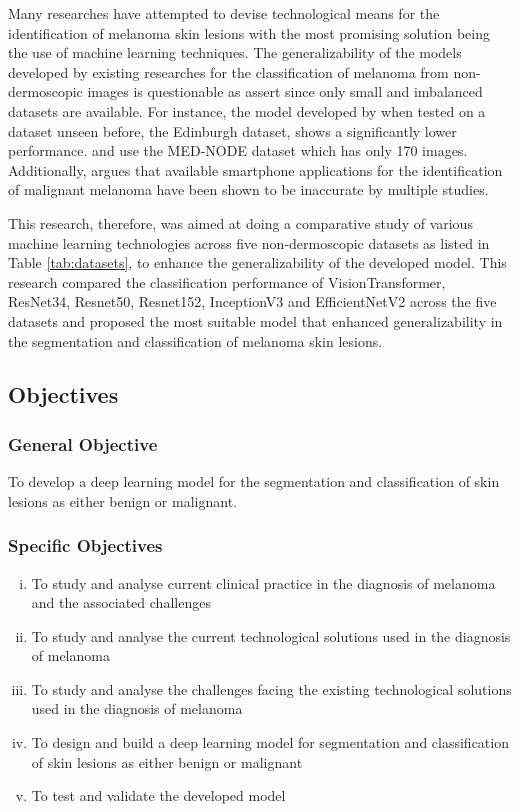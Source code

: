 \documentclass[12pt, a4paper]{article}
\begin{document}
Many researches have attempted to devise technological means for the identification of melanoma skin lesions with the most promising solution being the use of machine learning techniques. The generalizability of the models developed by existing researches for the classification of melanoma from non-dermoscopic images is questionable as \cite{yoon2019generalizable} assert since only small and imbalanced datasets are available. For instance, the model developed by \cite{HAN20181529} when tested on a dataset unseen before, the Edinburgh dataset, shows a significantly lower performance. \cite{perez2021ensemble} and \cite{7590963} use the MED-NODE dataset which has only 170 images. Additionally, \cite{davis2019current} argues that available smartphone applications for the identification of malignant melanoma have been shown to be inaccurate by multiple studies.

This research, therefore, was aimed at doing a comparative study of various machine learning technologies across five non-dermoscopic datasets as listed in Table \ref{tab:datasets}, to enhance the generalizability of the developed model. This research compared the classification performance of VisionTransformer, ResNet34, Resnet50, Resnet152, InceptionV3 and EfficientNetV2 across the five datasets and proposed the most suitable model that enhanced generalizability in the segmentation and classification of melanoma skin lesions.
\subsection{Objectives}
\subsubsection{General Objective}
To develop a deep learning model for the segmentation and classification of skin lesions as either benign or malignant.
\subsubsection{Specific Objectives}
\begin{enumerate}[(i)]
    \item To study and analyse current clinical practice in the diagnosis of melanoma and the associated challenges
    \item To study and analyse the current technological solutions used in the diagnosis of melanoma
    \item To study and analyse the challenges facing the existing technological solutions used in the diagnosis of melanoma
    \item To design and build a deep learning model for segmentation and classification of skin lesions as either benign or malignant
    \item To test and validate the developed model
\end{enumerate}
\end{document}
